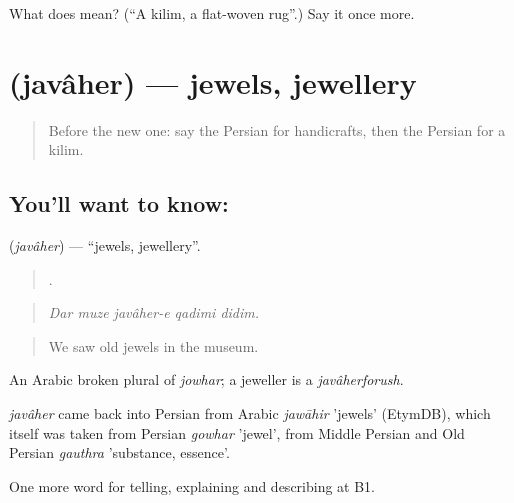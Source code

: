 \begin{tcolorbox}[breakable,colback=teal!4,colframe=teal!35!black,title={Before you move on}]
What does  mean? (\textquotedblleft{}A kilim, a flat-woven rug\textquotedblright{}.) Say it once more.
\end{tcolorbox}
\section[\texorpdfstring{\fa{جواهر} (javâher)}{جواهر (javâher)}]{ (javâher) — jewels, jewellery}

\label{lesson:FA-C463-javaher}



\begin{quote}
Before the new one: say the Persian for handicrafts, then the Persian for a kilim.
\end{quote}

\subsection*{You'll want to know: }
\textbf{} (\emph{javâher}) — \textquotedblleft{}jewels, jewellery\textquotedblright{}.

\begin{quote}
    .
\end{quote}

\begin{quote}
\emph{Dar muze javâher-e qadimi didim.}
\end{quote}

\begin{quote}
We saw old jewels in the museum.
\end{quote}

An Arabic broken plural of \emph{jowhar}; a jeweller is a \emph{javâherforush}.

\begin{cousinweb}
\emph{javâher} came back into Persian from Arabic \emph{jawāhir} 'jewels' (EtymDB), which itself was taken from Persian \emph{gowhar} 'jewel', from Middle Persian and Old Persian \emph{gauthra} 'substance, essence'.
\end{cousinweb}

\begin{grammarlens}[title={What you've built}]
One more word for telling, explaining and describing at B1.
\end{grammarlens}

